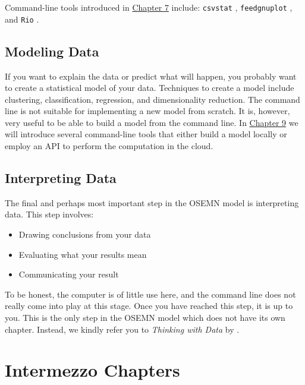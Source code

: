 \documentclass[
]{book}
\providecommand{\tightlist}{%
  \setlength{\itemsep}{0pt}\setlength{\parskip}{0pt}}
\theoremstyle{definition}
\theoremstyle{definition}
\theoremstyle{definition}
\theoremstyle{remark}
\begin{document}
Command-line tools introduced in \protect\hyperlink{chapter-7-exploring-data}{Chapter 7} include: \texttt{csvstat} \citep{csvstat}, \texttt{feedgnuplot} \citep{feedgnuplot}, and \texttt{Rio} \citep{Rio}.

\hypertarget{modeling-data}{%
\subsection{Modeling Data}\label{modeling-data}}

If you want to explain the data or predict what will happen, you probably want to create a statistical model of your data. Techniques to create a model include clustering, classification, regression, and dimensionality reduction. The command line is not suitable for implementing a new model from scratch. It is, however, very useful to be able to build a model from the command line. In \protect\hyperlink{chapter-9-modeling-data}{Chapter 9} we will introduce several command-line tools that either build a model locally or employ an API to perform the computation in the cloud.

\hypertarget{interpreting-data}{%
\subsection{Interpreting Data}\label{interpreting-data}}

The final and perhaps most important step in the OSEMN model is interpreting data. This step involves:

\begin{itemize}
\tightlist
\item
  Drawing conclusions from your data
\item
  Evaluating what your results mean
\item
  Communicating your result
\end{itemize}

To be honest, the computer is of little use here, and the command line does not really come into play at this stage. Once you have reached this step, it is up to you. This is the only step in the OSEMN model which does not have its own chapter. Instead, we kindly refer you to \emph{Thinking with Data} by \citet{Shron2014}.

\hypertarget{intermezzo-chapters}{%
\section{Intermezzo Chapters}\label{intermezzo-chapters}}
\end{document}
